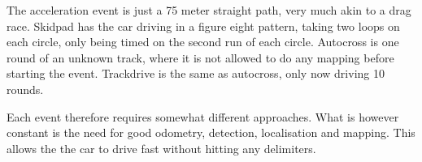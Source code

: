 The acceleration event is just a 75 meter straight path, very much akin to a drag race. Skidpad has the car driving in a figure eight pattern, taking two loops on each circle, only being timed on the second run of each circle. Autocross is one round of an unknown track, where it is not allowed to do any mapping before starting the event. Trackdrive is the same as autocross, only now driving 10 rounds. 

Each event therefore requires somewhat different approaches. What is however constant is the need for good odometry, detection, localisation and mapping. This allows the the car to drive fast without hitting any delimiters.